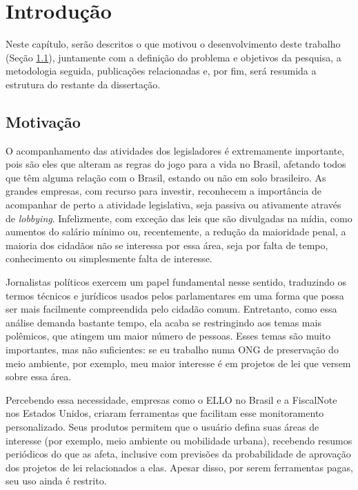 \chapter{Introdução} \label{intro}

Neste capítulo, serão descritos o que motivou o desenvolvimento deste trabalho
(Seção \ref{sec:motivacao}), juntamente com a definição do problema e objetivos
da pesquisa, a metodologia seguida, publicações relacionadas e, por fim, será
resumida a estrutura do restante da dissertação.

\section{Motivação}\label{sec:motivacao}

O acompanhamento das atividades dos legisladores é extremamente importante,
pois são eles que alteram as regras do jogo para a vida no Brasil, afetando
todos que têm alguma relação com o Brasil, estando ou não em solo brasileiro.
As grandes empresas, com recurso para investir, reconhecem a importância de
acompanhar de perto a atividade legislativa, seja passiva ou ativamente através
de \emph{lobbying}. Infelizmente, com exceção das leis que são divulgadas na
mídia, como aumentos do salário mínimo ou, recentemente, a redução da
maioridade penal, a maioria dos cidadãos não se interessa por essa área, seja
por falta de tempo, conhecimento ou simplesmente falta de interesse.

Jornalistas políticos exercem um papel fundamental nesse sentido, traduzindo os
termos técnicos e jurídicos usados pelos parlamentares em uma forma que possa
ser mais facilmente compreendida pelo cidadão comum. Entretanto, como essa
análise demanda bastante tempo, ela acaba se restringindo aos temas mais
polêmicos, que atingem um maior número de pessoas. Esses temas são muito
importantes, mas não suficientes: se eu trabalho numa ONG de preservação do
meio ambiente, por exemplo, meu maior interesse é em projetos de lei que versem
sobre essa área.

Percebendo essa necessidade, empresas como o \gls{ELLO} no Brasil e a
FiscalNote nos Estados Unidos, criaram ferramentas que facilitam esse
monitoramento personalizado. Seus produtos permitem que o usuário defina suas
áreas de interesse (por exemplo, meio ambiente ou mobilidade urbana),
recebendo resumos periódicos do que as afeta, inclusive com previsões da
probabilidade de aprovação dos projetos de lei relacionados a elas. Apesar
disso, por serem ferramentas pagas, seu uso ainda é restrito.

